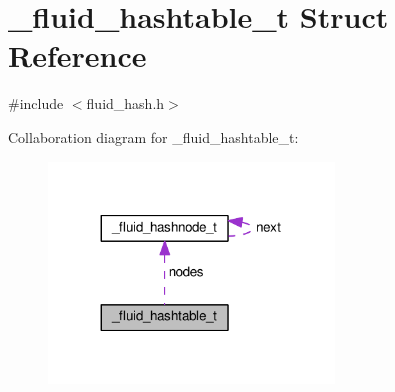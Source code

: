 \hypertarget{struct__fluid__hashtable__t}{}\section{\+\_\+fluid\+\_\+hashtable\+\_\+t Struct Reference}
\label{struct__fluid__hashtable__t}


{\ttfamily \#include $<$fluid\+\_\+hash.\+h$>$}



Collaboration diagram for \+\_\+fluid\+\_\+hashtable\+\_\+t\+:
\nopagebreak
\begin{figure}[H]
\begin{center}
\leavevmode
\includegraphics[width=215pt]{struct__fluid__hashtable__t__coll__graph}
\end{center}
\end{figure}

